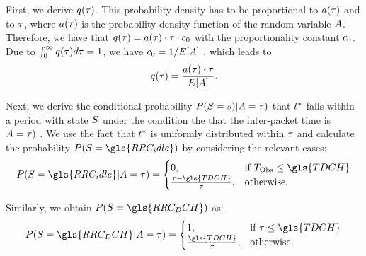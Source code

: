 First, we derive \(q(\tau)\). 
This probability density has to be proportional to \(a(\tau)\) and to \(\tau\), where \(a(\tau)\) is the probability density function of the random variable \(A\). 
Therefore, we have that 
\(q(\tau)=a(\tau)\cdot\tau\cdot c_0\)
with the proportionality constant \(c_0\).
Due to 
\(\int_0^\infty q(\tau)d\tau=1\),
we have 
\(c_0=1/E[A]\)
, which leads to
\begin{equation*}
q(\tau)=\frac{a(\tau) \cdot \tau}{E[A]}.
\label{eq:network:performance_model:system_description:state_distribution:observation_density}
\end{equation*}

Next, we derive the conditional probability
\(P(S=s) \vert A = \tau)\)
that \(t^*\) falls within a period with state \(S\) under the condition the that the inter-packet time is
\(A = \tau)\)
. We use the fact that \(t^*\) is uniformly distributed within \(\tau\) and calculate the probability 
\(P(\RRCState = \gls{RRC_idle})\)
by considering the relevant cases:
\begin{equation}
P(\RRCState=\gls{RRC_idle}\vert \PacketIAT = \ObservationIntervalLength)=
\begin{cases} 
	0,  & \mbox{if } \ObservationInterval \leq \gls{TDCH} \\ 
    \frac{\ObservationIntervalLength - \gls{TDCH}}{\ObservationIntervalLength}, & \mbox{otherwise.}	 
\end{cases}
\end{equation}

Similarly, we obtain \(P(\RRCState = \gls{RRC_DCH})\) as:
\begin{equation}
P(\RRCState=\gls{RRC_DCH} \vert \PacketIAT = \ObservationIntervalLength)=
\begin{cases} 
	1,  & \mbox{if } \ObservationIntervalLength \leq \gls{TDCH} \\ 
    \frac{\gls{TDCH}}{\ObservationIntervalLength}, & \mbox{otherwise.}	 
\end{cases}
\label{eq:network:performance_model:system_description:state_distribution:conditional_probability_dch}
\end{equation} 

